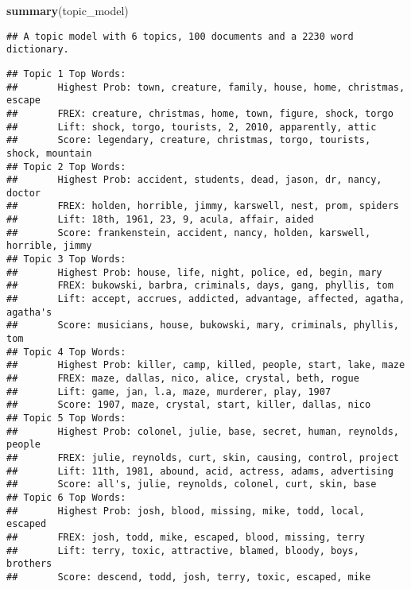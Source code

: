 \documentclass[
]{article}
\newenvironment{Shaded}{\begin{snugshade}}{\end{snugshade}}
\newcommand{\FunctionTok}[1]{\textcolor[rgb]{0.13,0.29,0.53}{\textbf{#1}}}
\newcommand{\NormalTok}[1]{#1}
\begin{document}
\begin{Shaded}
\begin{Highlighting}[]
\FunctionTok{summary}\NormalTok{(topic\_model)}
\end{Highlighting}
\end{Shaded}

\begin{verbatim}
## A topic model with 6 topics, 100 documents and a 2230 word dictionary.
\end{verbatim}

\begin{verbatim}
## Topic 1 Top Words:
##       Highest Prob: town, creature, family, house, home, christmas, escape 
##       FREX: creature, christmas, home, town, figure, shock, torgo 
##       Lift: shock, torgo, tourists, 2, 2010, apparently, attic 
##       Score: legendary, creature, christmas, torgo, tourists, shock, mountain 
## Topic 2 Top Words:
##       Highest Prob: accident, students, dead, jason, dr, nancy, doctor 
##       FREX: holden, horrible, jimmy, karswell, nest, prom, spiders 
##       Lift: 18th, 1961, 23, 9, acula, affair, aided 
##       Score: frankenstein, accident, nancy, holden, karswell, horrible, jimmy 
## Topic 3 Top Words:
##       Highest Prob: house, life, night, police, ed, begin, mary 
##       FREX: bukowski, barbra, criminals, days, gang, phyllis, tom 
##       Lift: accept, accrues, addicted, advantage, affected, agatha, agatha's 
##       Score: musicians, house, bukowski, mary, criminals, phyllis, tom 
## Topic 4 Top Words:
##       Highest Prob: killer, camp, killed, people, start, lake, maze 
##       FREX: maze, dallas, nico, alice, crystal, beth, rogue 
##       Lift: game, jan, l.a, maze, murderer, play, 1907 
##       Score: 1907, maze, crystal, start, killer, dallas, nico 
## Topic 5 Top Words:
##       Highest Prob: colonel, julie, base, secret, human, reynolds, people 
##       FREX: julie, reynolds, curt, skin, causing, control, project 
##       Lift: 11th, 1981, abound, acid, actress, adams, advertising 
##       Score: all's, julie, reynolds, colonel, curt, skin, base 
## Topic 6 Top Words:
##       Highest Prob: josh, blood, missing, mike, todd, local, escaped 
##       FREX: josh, todd, mike, escaped, blood, missing, terry 
##       Lift: terry, toxic, attractive, blamed, bloody, boys, brothers 
##       Score: descend, todd, josh, terry, toxic, escaped, mike
\end{verbatim}
\end{document}
